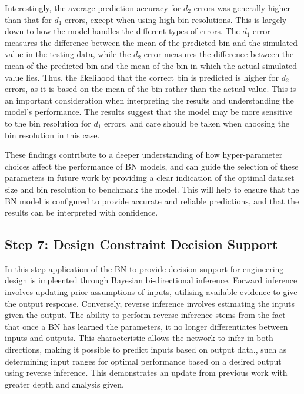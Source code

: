 \documentclass[journal]{IEEEtran}
\begin{document}
Interestingly, the average prediction accuracy for $d_{2}$ errors was generally higher than that for $d_{1}$ errors, except when using high bin resolutions. This is largely down to how the model handles the different types of errors. The $d_{1}$ error measures the difference between the mean of the predicted bin and the simulated value in the testing data, while the $d_{2}$ error measures the difference between the mean of the predicted bin and the mean of the bin in which the actual simulated value lies. Thus, the likelihood that the correct bin is predicted is higher for $d_{2}$ errors, as it is based on the mean of the bin rather than the actual value. This is an important consideration when interpreting the results and understanding the model's performance. The results suggest that the model may be more sensitive to the bin resolution for $d_{1}$ errors, and care should be taken when choosing the bin resolution in this case.

These findings contribute to a deeper understanding of how hyper-parameter choices affect the performance of BN models, and can guide the selection of these parameters in future work by providing a clear indication of the optimal dataset size and bin resolution to benchmark the model. This will help to ensure that the BN model is configured to provide accurate and reliable predictions, and that the results can be interpreted with confidence.

\subsection{\textbf{Step 7}: Design Constraint Decision Support}\label{sec:meth_decision}

In this step application of the BN to provide decision support for engineering design is impleented through Bayesian bi-directional inference. Forward inference involves updating prior assumptions of inputs, utilising available evidence to give the output response. Conversely, reverse inference involves estimating the inputs given the output. The ability to perform reverse inference stems from the fact that once a BN has learned the parameters, it no longer differentiates between inputs and outputs. This characteristic allows the network to infer in both directions, making it possible to predict inputs based on output data., such as determining input ranges for optimal performance based on a desired output using reverse inference. This demonstrates an update from previous work with greater depth and analysis given. 
\end{document}
